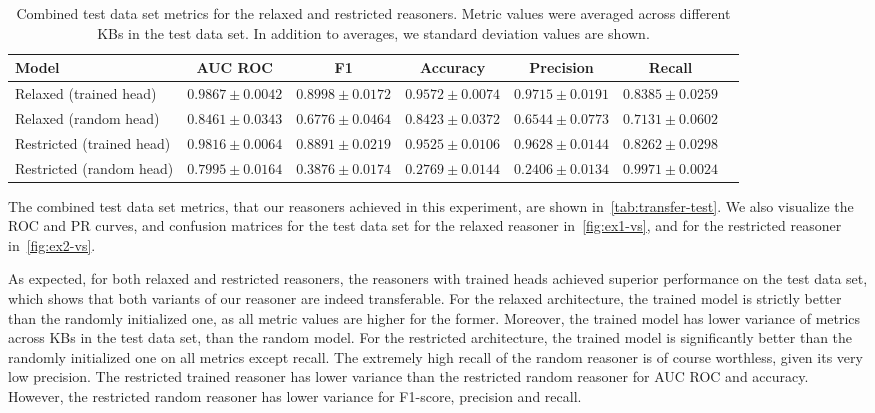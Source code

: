 \begin{table}
\caption{
Combined test data set metrics for the relaxed and restricted reasoners.
Metric values were averaged across different KBs in the test data set.
In addition to averages, we standard deviation values are shown.
}
\label{tab:transfer-test}
\begin{adjustwidth}{-2cm}{-2cm}
\centering
\begin{tabular}{lcccccc}
\toprule
Model              & AUC ROC & F1     & Accuracy & Precision & Recall \\
\midrule
Relaxed (trained head)    & $0.9867 \pm 0.0042$ & $0.8998 \pm 0.0172$ & $0.9572 \pm 0.0074$ & $0.9715 \pm 0.0191$ & $0.8385 \pm 0.0259$ \\
Relaxed (random head)     & $0.8461 \pm 0.0343$ & $0.6776 \pm 0.0464$ & $0.8423 \pm 0.0372$ & $0.6544 \pm 0.0773$ & $0.7131 \pm 0.0602$ \\
\midrule
Restricted (trained head) & $0.9816 \pm 0.0064$ & $0.8891 \pm 0.0219$ & $0.9525 \pm 0.0106$ & $0.9628 \pm 0.0144$ & $0.8262 \pm 0.0298$ \\
Restricted (random head)  & $0.7995 \pm 0.0164$ & $0.3876 \pm 0.0174$ & $0.2769 \pm 0.0144$ & $0.2406 \pm 0.0134$ & $0.9971 \pm 0.0024$ \\
\bottomrule
\end{tabular}
\end{adjustwidth}
\end{table}

The combined test data set metrics, that our reasoners achieved in this experiment, are shown in~\autoref{tab:transfer-test}.
We also visualize the ROC and PR curves, and confusion matrices for the test data set for the relaxed reasoner in~\autoref{fig:ex1-vs}, and for the restricted reasoner in~\autoref{fig:ex2-vs}.

As expected, for both relaxed and restricted reasoners, the reasoners with trained heads achieved superior performance on the test data set, which shows that both variants of our reasoner are indeed transferable.
For the relaxed architecture, the trained model is strictly better than the randomly initialized one, as all metric values are higher for the former.
Moreover, the trained model has lower variance of metrics across KBs in the test data set, than the random model. 
For the restricted architecture, the trained model is significantly better than the randomly initialized one on all metrics except recall.
The extremely high recall of the random reasoner is of course worthless, given its very low precision.
The restricted trained reasoner has lower variance than the restricted random reasoner for AUC ROC and accuracy.
However, the restricted random reasoner has  lower variance for F1-score, precision and recall.

